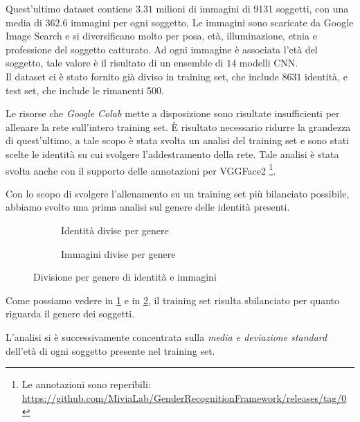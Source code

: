 Quest'ultimo dataset contiene $3.31$ milioni di immagini di 9131 soggetti, con una media di $362.6$ immagini per ogni soggetto. Le immagini sono scaricate da Google Image Search e si diversificano molto per posa, età, illuminazione, etnia e professione del soggetto catturato. Ad ogni immagine è associata l'età del soggetto, tale valore è il risultato di un ensemble di $14$ modelli CNN.\\
Il dataset ci è stato fornito già diviso in training set, che include $8631$ identità, e test set, che include le rimanenti 500.

 Le risorse che \textit{Google Colab} mette a disposizione sono risultate insufficienti per allenare la rete sull'intero training set. È risultato necessario ridurre la grandezza di quest'ultimo, a tale scopo è stata svolta un analisi del training set e sono stati scelte le identità su cui svolgere l'addestramento della rete. Tale analisi è stata svolta anche con il supporto delle annotazioni per VGGFace2 \footnote{Le annotazioni sono reperibili: \url{https://github.com/MiviaLab/GenderRecognitionFramework/releases/tag/0}}.

Con lo scopo di svolgere l'allenamento su un training set più bilanciato possibile, abbiamo svolto una prima analisi sul genere delle identità presenti.

\begin{figure}[H]

\begin{subfigure}{0.5\textwidth}
\def\svgscale{0.5}

\caption{Identità divise per genere}
\label{sfig:Ids per gender}
\end{subfigure}
\begin{subfigure}{0.5\textwidth}
\def\svgscale{0.5}

\caption{Immagini divise per genere}
\label{sfig:Images per gender}
\end{subfigure}
\caption{Divisione per genere di identità e immagini}
\label{fig:gender_division}
\end{figure}

Come possiamo vedere in \ref{sfig:Ids per gender} e in \ref{sfig:Images per gender}, il training set risulta sbilanciato per quanto riguarda il genere dei soggetti.

L'analisi si è successivamente concentrata sulla \emph{media e deviazione standard} dell'età di ogni soggetto presente nel training set.

